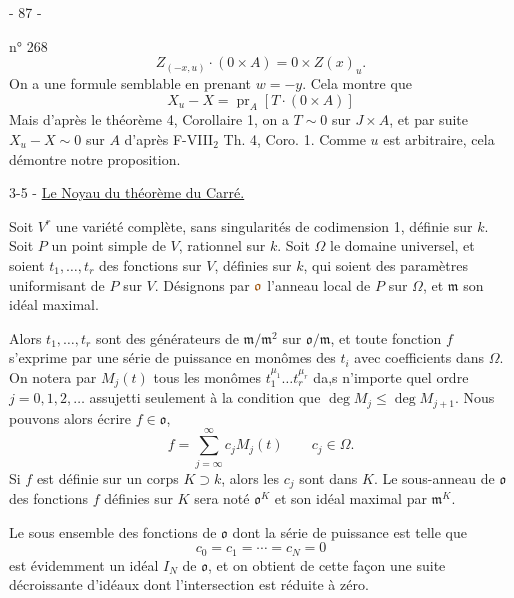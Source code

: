 \begin{center}- 87 -\end{center}
n° 268
\[
Z_{(-x,u)}\cdot(0\times A)=0\times Z(x)_u.
\]
On a une formule semblable en prenant $w=-y$. Cela montre que
\[
X_u-X=\operatorname{pr}_A[T\cdot(0\times A)]
\]
Mais d'après le théorème 4, Corollaire 1, on a $T\sim0$ sur $J\times A$, et par suite $X_u-X\sim0$ sur $A$ d'après F-VIII$_2$ Th. 4, Coro. 1. Comme $u$ est arbitraire, cela démontre notre proposition.

3-5 - \uline{Le Noyau du théorème du Carré.}

Soit $V^r$ une variété complète, sans singularités de codimension 1, définie sur $k$. Soit $P$ un point simple de $V$, rationnel sur $k$. Soit $\Omega$ le domaine universel, et soient $t_1,\ldots,t_r$ des fonctions sur $V$, définies sur $k$, qui soient des paramètres uniformisant de $P$ sur $V$. Désignons par $\unsure{\mathfrak{o}}$ l'anneau local de $P$ sur $\Omega$, et $\mathfrak{m}$ son idéal maximal.

Alors $t_1,\ldots,t_r$ sont des générateurs de $\mathfrak{m}/\mathfrak{m}^2$ sur $\mathfrak{o}/\mathfrak{m}$, et toute fonction $f$ s'exprime par une série de puissance en monômes des $t_i$ avec coefficients dans $\Omega$. On notera par $M_j(t)$ tous les monômes $t_1^{\mu_1}\ldots t_r^{\mu_r}$ da,s n'importe quel ordre $j=0,1,2,\ldots$ assujetti seulement à la condition que $\deg M_j\leq\deg M_{j+1}$. Nous pouvons alors écrire $f\in\mathfrak{o}$,
\[
f=\sum_{j=\infty}^{\infty}c_jM_j(t)\qquad c_j\in\Omega.
\]
Si $f$ est définie sur un corps $K\supset k$, alors les $c_j$ sont dans $K$. Le sous-anneau de $\mathfrak{o}$ des fonctions $f$ définies sur $K$ sera noté $\mathfrak{o}^K$ et son idéal maximal par $\mathfrak{m}^K$.

Le sous ensemble des fonctions de $\mathfrak{o}$ dont la série de puissance est telle que
\[
c_0=c_1=\cdots=c_N=0
\]
est évidemment un idéal $I_N$ de $\mathfrak{o}$, et on obtient de cette façon une suite décroissante d'idéaux dont l'intersection est réduite à zéro.
